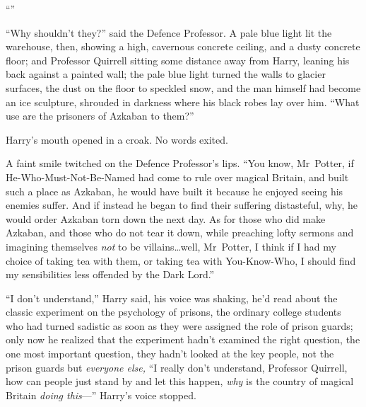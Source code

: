 “”

“Why shouldn’t they?” said the Defence Professor. A pale blue light lit the warehouse, then, showing a high, cavernous concrete ceiling, and a dusty concrete floor; and Professor Quirrell sitting some distance away from Harry, leaning his back against a painted wall; the pale blue light turned the walls to glacier surfaces, the dust on the floor to speckled snow, and the man himself had become an ice sculpture, shrouded in darkness where his black robes lay over him. “What use are the prisoners of Azkaban to them?”

Harry’s mouth opened in a croak. No words exited.

A faint smile twitched on the Defence Professor’s lips. “You know, Mr~Potter, if He-Who-Must-Not-Be-Named had come to rule over magical Britain, and built such a place as Azkaban, he would have built it because he enjoyed seeing his enemies suffer. And if instead he began to find their suffering distasteful, why, he would order Azkaban torn down the next day. As for those who did make Azkaban, and those who do not tear it down, while preaching lofty sermons and imagining themselves \emph{not} to be villains…well, Mr~Potter, I think if I had my choice of taking tea with them, or taking tea with You-Know-Who, I should find my sensibilities less offended by the Dark Lord.”

“I don’t understand,” Harry said, his voice was shaking, he’d read about the classic experiment on the psychology of prisons, the ordinary college students who had turned sadistic as soon as they were assigned the role of prison guards; only now he realized that the experiment hadn’t examined the right question, the one most important question, they hadn’t looked at the key people, not the prison guards but \emph{everyone else,} “I really don’t understand, Professor Quirrell, how can people just stand by and let this happen, \emph{why} is the country of magical Britain \emph{doing this}—” Harry’s voice stopped.

